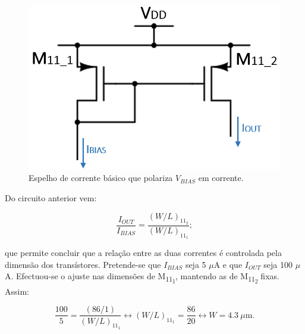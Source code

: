 \documentclass[11pt]{article}
\numberwithin{equation}{section}
\begin{document}
\begin{figure}[H]
	\centering
	\includegraphics[keepaspectratio=true, scale=0.45]{teoricas/cmirror}
	\vspace{-0.5em}
	\caption{Espelho de corrente básico que polariza $V_{BIAS}$ em corrente.}
	\vspace{-0.8em}
\end{figure}

Do circuito anterior vem:

\vspace{-3mm}
\begin{equation}
	\frac{I_{OUT}}{I_{BIAS}} = \frac{\left(W/L\right)_{11_{2}}}{\left(W/L\right)_{11_{1}}};
\end{equation}

\vspace{1mm}
que permite concluir que a relação entre as duas correntes é controlada pela dimensão dos transístores. Pretende-se que $I_{BIAS}$ seja 5 $\mu$A e que $I_{OUT}$ seja 100 $\mu$A. Efectuou-se o ajuste nas dimensões de M\textsubscript{11\textsubscript{1}}, mantendo as de M\textsubscript{11\textsubscript{2}} fixas. Assim:

\vspace{-3mm}
\begin{equation}
\frac{100}{5} = \frac{\left(86/1\right)}{\left(W/L\right)_{11_{1}}} \leftrightarrow \left(W/L\right)_{11_{1}} = \frac{86}{20} \leftrightarrow W = 4.3~\mu\text{m}.
\end{equation}

\vspace{1mm}


\end{document}

